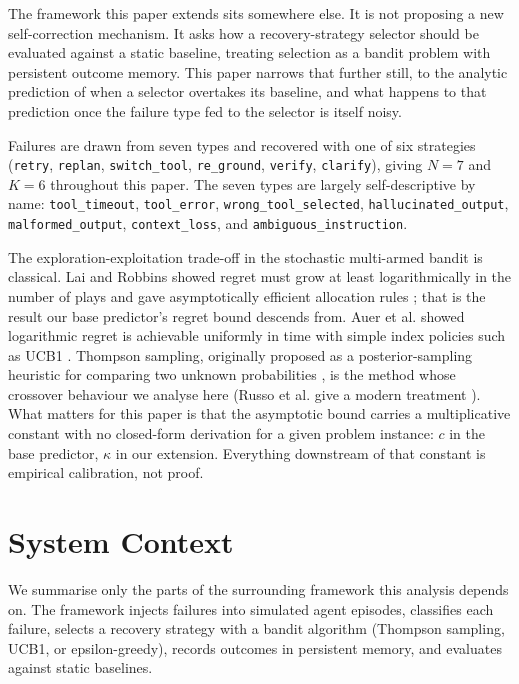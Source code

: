 \documentclass[conference]{IEEEtran}
\begin{document}
The framework this paper extends sits somewhere else. It is not proposing
a new self-correction mechanism. It asks how a recovery-strategy selector
should be evaluated against a static baseline, treating selection as a
bandit problem with persistent outcome memory. This paper narrows that
further still, to the analytic prediction of when a selector overtakes
its baseline, and what happens to that prediction once the failure type
fed to the selector is itself noisy.

Failures are drawn from seven types and recovered with one of six
strategies (\texttt{retry}, \texttt{replan}, \texttt{switch\_tool},
\texttt{re\_ground}, \texttt{verify}, \texttt{clarify}), giving $N=7$ and
$K=6$ throughout this paper. The seven types are largely self-descriptive
by name: \texttt{tool\_timeout}, \texttt{tool\_error},
\texttt{wrong\_tool\_selected}, \texttt{hallucinated\_output},
\texttt{malformed\_output}, \texttt{context\_loss}, and
\texttt{ambiguous\_instruction}.

The exploration-exploitation trade-off in the stochastic multi-armed
bandit is classical. Lai and Robbins showed regret must grow at least
logarithmically in the number of plays and gave asymptotically efficient
allocation rules \cite{lai1985}; that is the result our base predictor's
regret bound descends from. Auer et al. showed logarithmic regret is
achievable uniformly in time with simple index policies such as UCB1
\cite{auer2002}. Thompson sampling, originally proposed as a
posterior-sampling heuristic for comparing two unknown probabilities
\cite{thompson1933}, is the method whose crossover behaviour we analyse
here (Russo et al. give a modern treatment \cite{russo2018}). What matters
for this paper is that the asymptotic bound carries a multiplicative
constant with no closed-form derivation for a given problem instance:
$c$ in the base predictor, $\kappa$ in our extension. Everything
downstream of that constant is empirical calibration, not proof.

\section{System Context}

We summarise only the parts of the surrounding framework this analysis
depends on. The framework injects failures into simulated agent episodes,
classifies each failure, selects a recovery strategy with a bandit
algorithm (Thompson sampling, UCB1, or epsilon-greedy), records outcomes
in persistent memory, and evaluates against static baselines.
\end{document}
